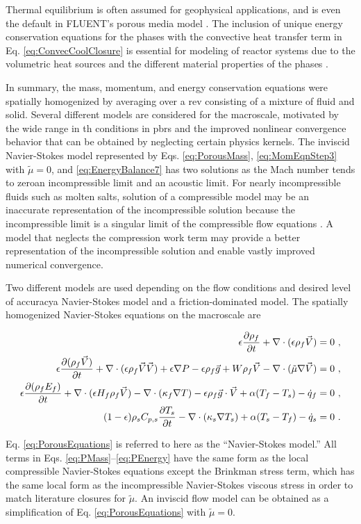 \noindent Thermal equilibrium is often assumed for geophysical applications, and is even the default in FLUENT's porous media model \cite{fluent}. The inclusion of unique energy conservation equations for the phases with the convective heat transfer term in Eq. \eqref{eq:ConvecCoolClosure} is essential for modeling of reactor systems due to the volumetric heat sources and the different material properties of the phases \cite{becker,novak_sana}.

In summary, the mass, momentum, and energy conservation equations were spatially homogenized by averaging over a \gls{rev} consisting of a mixture of fluid and solid. Several different models are considered for the macroscale, motivated by the wide range in \gls{th} conditions in \glspl{pbr} and the improved nonlinear convergence behavior that can be obtained by neglecting certain physics kernels. The inviscid Navier-Stokes model represented by Eqs. \eqref{eq:PorousMass}, \eqref{eq:MomEqnStep3} with \(\tilde{\mu}=0\), and \eqref{eq:EnergyBalance7} has two solutions as the Mach number tends to zero\mdash an incompressible limit and an acoustic limit. For nearly incompressible fluids such as molten salts, solution of a compressible model may be an inaccurate representation of the incompressible solution because the incompressible limit is a singular limit of the compressible flow equations \cite{guillard}. A model that neglects the compression work term may provide a better representation of the incompressible solution and enable vastly improved numerical convergence.

Two different models are used depending on the flow conditions and desired level of accuracy\mdash a Navier-Stokes model and a friction-dominated model. The spatially homogenized Navier-Stokes equations on the macroscale are

\begin{subequations}
\label{eq:PorousEquations}
\begin{align}
\label{eq:PMass}\epsilon\frac{\partial\rho_f}{\partial t} + \nabla\cdot(\epsilon\rho_f\vec{V})=0\ ,\\
\label{eq:PMom}\epsilon\frac{\partial(\rho_f\vec{V})}{\partial t}+\nabla\cdot(\epsilon\rho_f\vec{V}\vec{V})+\epsilon\nabla P-\epsilon\rho_f\vec{g}+W\rho_f\vec{V}-\nabla\cdot(\tilde{\mu}\nabla\vec{V})=0\ ,\\
\label{eq:PEnergy}\epsilon\frac{\partial (\rho_f E_f)}{\partial t}+\nabla\cdot(\epsilon H_f\rho_f\vec{V})-\nabla\cdot(\kappa_f\nabla T)-\epsilon\rho_f \vec{g}\cdot\vec{V}+\alpha(T_f-T_s)-\dot{q}_f=0\ ,\\
\label{eq:PSEnergy}(1-\epsilon)\rho_sC_{p,s}\frac{\partial T_s}{\partial t}-\nabla\cdot(\kappa_s\nabla T_s)+\alpha(T_s-T_f)-\dot{q}_s=0\ .
\end{align}
\end{subequations}

\noindent Eq. \eqref{eq:PorousEquations} is referred to here as the ``Navier-Stokes model.'' All terms in Eqs. \eqref{eq:PMass}--\eqref{eq:PEnergy} have the same form as the local compressible Navier-Stokes equations except the Brinkman stress term, which has the same local form as the incompressible Navier-Stokes viscous stress in order to match literature closures for \(\tilde{\mu}\). An inviscid flow model can be obtained as a simplification of Eq. \eqref{eq:PorousEquations} with \(\tilde{\mu}=0\).

